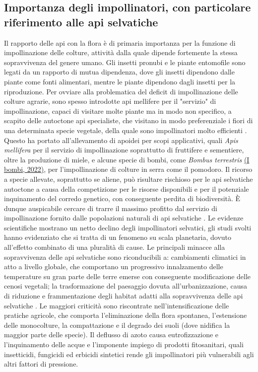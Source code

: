 \documentclass[main.tex]{subfiles}
\begin{document}
\subsection{Importanza degli impollinatori, con particolare riferimento alle api selvatiche}\label{Cap. 1.6}

Il rapporto delle api con la flora è di primaria importanza per la funzione di impollinazione delle colture, attività dalla quale dipende fortemente la stessa sopravvivenza del genere umano.
Gli insetti pronubi e le piante entomofile sono legati da un rapporto di mutua dipendenza, dove gli insetti dipendono dalle piante come fonti alimentari, mentre le piante dipendono dagli insetti per la riproduzione. Per ovviare alla problematica del deficit di impollinazione delle colture agrarie, sono spesso introdotte api mellifere per il "servizio" di impollinazione, capaci di visitare molte piante ma in modo non specifico, a scapito delle autoctone api specialiste, che visitano in modo preferenziale i fiori di una determinata specie vegetale, della quale sono impollinatori molto efficienti \citep{gomez}.
Questo ha portato all’allevamento di apoidei per scopi applicativi, quali \textit{Apis mellifera} per il servizio di impollinazione soprattutto di fruttifere e sementiere, oltre la produzione di miele, e alcune specie di bombi, come \textit{Bombus terrestris} \href{https://www.apicoltura.ch/apidologia/i-bombi.html}{(I bombi, 2022)}, per l’impollinazione di colture in serra come il pomodoro. Il ricorso a specie allevate, soprattutto se aliene, può risultare rischioso per le api selvatiche autoctone a causa della competizione per le risorse disponibili e per il potenziale inquinamento del corredo genetico, con conseguente perdita di biodiversità. È dunque auspicabile cercare di trarre il massimo profitto dal servizio di impollinazione fornito dalle popolazioni naturali di api selvatiche \citep{yoko}.
Le evidenze scientifiche mostrano un netto declino degli impollinatori selvatici, gli studi svolti hanno evidenziato che si tratta di un fenomeno su scala planetaria, dovuto all’effetto combinato di una pluralità di cause. Le principali minacce alla sopravvivenza delle api selvatiche sono riconducibili a: cambiamenti climatici in atto a livello globale, che comportano un progressivo innalzamento delle temperature su gran parte delle terre emerse con conseguente modificazione delle cenosi vegetali; la trasformazione del paesaggio dovuta all’urbanizzazione, causa di riduzione e frammentazione degli habitat adatti alla sopravvivenza delle api selvatiche \citep{lebuh}. Le maggiori criticità sono riscontrate nell’intensificazione delle pratiche agricole, che comporta l’eliminazione della flora spontanea, l’estensione delle monocolture, la compattazione e il degrado dei suoli (dove nidifica la maggior parte delle specie). Il deflusso di azoto causa eutrofizzazione e l’inquinamento delle acque e l’imponente impiego di prodotti fitosanitari, quali insetticidi, fungicidi ed erbicidi sintetici rende gli impollinatori più vulnerabili agli altri fattori di pressione.
\end{document}
